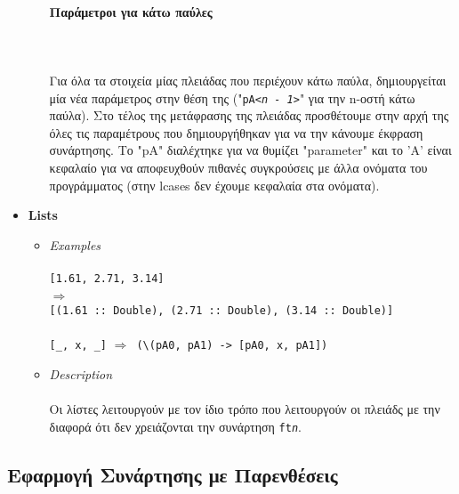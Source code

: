 \documentclass[diploma]{softlab-thesis}
\def\lra{$\Longrightarrow$\ }
\def\pend{\mbox{}\\\\}
\begin{document}
\begin{itemize}
\begin{itemize}
\paragraph{Παράμετροι για κάτω παύλες}\pend
Για όλα τα στοιχεία μίας πλειάδας που περιέχουν κάτω παύλα, δημιουργείται
μία νέα παράμετρος στην θέση της ("\texttt{pA\textit{<n - 1>}}" για την
n-οστή κάτω παύλα). Στο τέλος της μετάφρασης της πλειάδας προσθέτουμε στην
αρχή της όλες τις παραμέτρους που δημιουργήθηκαν για να την κάνουμε έκφραση
συνάρτησης. Το "pA" διαλέχτηκε για να θυμίζει "parameter" και το 'A' είναι
κεφαλαίο για να αποφευχθούν πιθανές συγκρούσεις με άλλα ονόματα του
προγράμματος (στην lcases δεν έχουμε κεφαλαία στα ονόματα).

\end{itemize}

\item
\textbf{Lists}

\begin{itemize}
\item
\textit{Examples}\\\\
\texttt{[1.61, 2.71, 3.14]}
\\ \lra \\
\verb|[(1.61 :: Double), (2.71 :: Double), (3.14 :: Double)]| \\\\
\verb|[_, x, _]| \lra \verb|(\(pA0, pA1) -> [pA0, x, pA1])| \\

\item
\textit{Description}\\\\
Οι λίστες λειτουργούν με τον ίδιο τρόπο που λειτουργούν οι πλειάδς με την
διαφορά ότι δεν χρειάζονται την συνάρτηση \texttt{ft\textit{n}}.

\end{itemize}

\end{itemize}

\newpage

\subsection{Εφαρμογή Συνάρτησης με Παρενθέσεις}
\end{document}
